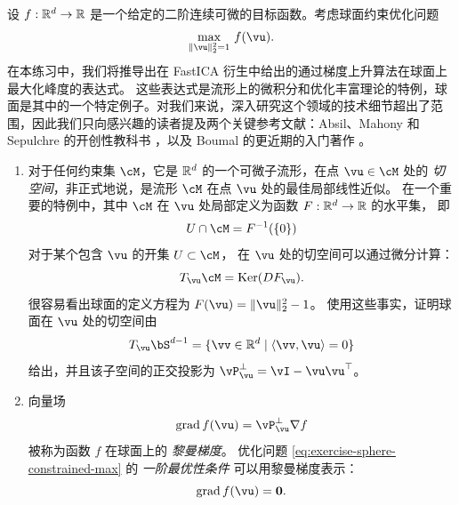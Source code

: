 \documentclass[../../book-main_zh.tex]{subfiles}
\begin{document}
\begin{exercise}\label{exercise:sphere-calculus}
    设 $f : \mathbb{R}^d \to \mathbb{R}$ 是一个给定的二阶连续可微的目标函数。考虑球面约束优化问题
    \begin{equation}\label{eq:exercise-sphere-constrained-max}
        \max_{\norm{\vu}_2^2 = 1}\, f(\vu). 
    \end{equation}
    在本练习中，我们将推导出在 FastICA 衍生中给出的通过梯度上升算法在球面上最大化峰度的表达式。
    这些表达式是流形上的微积分和优化丰富理论的特例，球面是其中的一个特定例子。对我们来说，深入研究这个领域的技术细节超出了范围，因此我们只向感兴趣的读者提及两个关键参考文献：Absil、Mahony 和 Sepulchre 的开创性教科书
    \cite{Absil2009-nc}，以及 Boumal 的更近期的入门著作 \cite{Boumal2023-rj}。
    \begin{enumerate}
        \item 对于任何约束集 $\cM$，它是 $\mathbb{R}^d$ 的一个可微子流形，在点 $\vu \in \cM$ 处的 \textit{切空间}，非正式地说，是流形 $\cM$ 在点 $\vu$ 处的最佳局部线性近似。
        在一个重要的特例中，其中 $\cM$ 在 $\vu$ 处局部定义为函数 $F : \mathbb{R}^d \to \mathbb{R}$ 的水平集，
        即
        \begin{equation*}
            U \cap \cM = F^{-1}(\set{0})
        \end{equation*}
        对于某个包含 $\vu$ 的开集 $U \subset \cM$，
        在 $\vu$ 处的切空间可以通过微分计算：
        \begin{equation*}
            T_{\vu} \cM = \Ker(DF_{\vu}).
        \end{equation*}
        很容易看出球面的定义方程为 $F(\vu) = \norm{\vu}_2^2 - 1$。
        使用这些事实，证明球面在 $\vu$ 处的切空间由
        \begin{equation*}
            T_{\vu} \bS^{d-1} = \set{\vv \in \R^d \given \ip{\vv}{\vu} = 0}
        \end{equation*}
        给出，并且该子空间的正交投影为 $\vP_{\vu}^\perp = \vI - \vu\vu^\top$。
        \item 向量场
        \begin{equation}\label{eq:exercise-riemann-grad-sphere}
        \mathrm{grad}\, f(\vu) = \vP_{\vu}^\perp \nabla f
        \end{equation}
        被称为函数 $f$ 在球面上的 \textit{黎曼梯度}。
        优化问题 \eqref{eq:exercise-sphere-constrained-max} 的 \textit{一阶最优性条件} 可以用黎曼梯度表示：
        \begin{equation*}
            \mathrm{grad}\, f(\vu) = \mathbf{0}.
        \end{equation*}

\end{enumerate}
\end{exercise}
\end{document}

